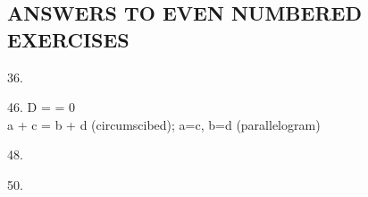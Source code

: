 \documentclass[11pt]{amsbook}
\begin{document}
    \begin{center}
        \section*{ANSWERS TO EVEN NUMBERED EXERCISES} 
    \end{center}
    
    \begin{hEnumerateArabic}
        \item[36.] 
        \item[46.]
            D =   = 0\\
            a + c = b + d   (circumscibed);   a=c, b=d (parallelogram)
        \item[48.]
        \item[50.]
    \end{hEnumerateArabic}
\end{document}
